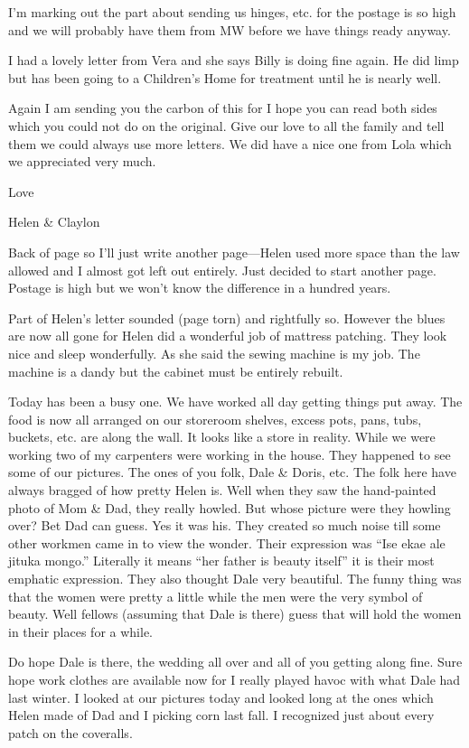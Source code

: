 \documentclass[
]{book}
\begin{document}
I'm marking out the part about sending us hinges, etc. for the postage is so high and we will probably have them from MW before we have things ready anyway.

I had a lovely letter from Vera and she says Billy is doing fine again. He did limp but has been going to a Children's Home for treatment until he is nearly well.

Again I am sending you the carbon of this for I hope you can read both sides which you could not do on the original. Give our love to all the family and tell them we could always use more letters. We did have a nice one from Lola which we appreciated very much.

Love

Helen \& Claylon

Back of page so I'll just write another page---Helen used more space than the law allowed and I almost got left out entirely. Just decided to start another page. Postage is high but we won't know the difference in a hundred years.

Part of Helen's letter sounded (page torn) and rightfully so. However the blues are now all gone for Helen did a wonderful job of mattress patching. They look nice and sleep wonderfully. As she said the sewing machine is my job. The machine is a dandy but the cabinet must be entirely rebuilt.

Today has been a busy one. We have worked all day getting things put away. The food is now all arranged on our storeroom shelves, excess pots, pans, tubs, buckets, etc. are along the wall. It looks like a store in reality. While we were working two of my carpenters were working in the house. They happened to see some of our pictures. The ones of you folk, Dale \& Doris, etc. The folk here have always bragged of how pretty Helen is. Well when they saw the hand-painted photo of Mom \& Dad, they really howled. But whose picture were they howling over? Bet Dad can guess. Yes it was his. They created so much noise till some other workmen came in to view the wonder. Their expression was ``Ise ekae ale jituka mongo.'' Literally it means ``her father is beauty itself'' it is their most emphatic expression. They also thought Dale very beautiful. The funny thing was that the women were pretty a little while the men were the very symbol of beauty. Well fellows (assuming that Dale is there) guess that will hold the women in their places for a while.

Do hope Dale is there, the wedding all over and all of you getting along fine. Sure hope work clothes are available now for I really played havoc with what Dale had last winter. I looked at our pictures today and looked long at the ones which Helen made of Dad and I picking corn last fall. I recognized just about every patch on the coveralls.
\end{document}
